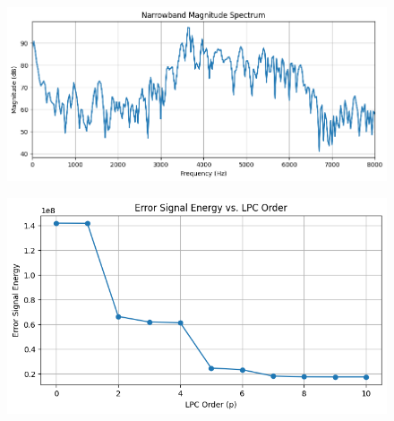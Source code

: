\documentclass{article}
\begin{document}
\begin{figure}[H]
\begin{center}
\includegraphics[scale = 0.5]{mag2.png}
\end{center}
\end{figure}

\begin{figure}[H]
\begin{center}
\includegraphics[scale = 0.5]{err2.png}
\end{center}
\end{figure}
\end{document}
